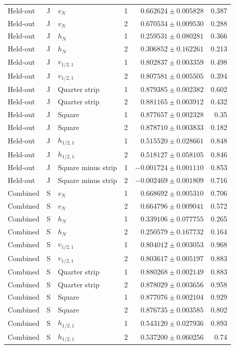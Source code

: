 {\begin{longtable}{lllrrr}
Held-out & J & $v_N$ & 1 & $0.662624\pm0.005828$ & 0.387\\
Held-out & J & $v_N$ & 2 & $0.670534\pm0.009530$ & 0.288\\
Held-out & J & $h_N$ & 1 & $0.259531\pm0.080281$ & 0.366\\
Held-out & J & $h_N$ & 2 & $0.306852\pm0.162261$ & 0.213\\
Held-out & J & $v_{1/2,1}$ & 1 & $0.802837\pm0.003359$ & 0.498\\
Held-out & J & $v_{1/2,1}$ & 2 & $0.807581\pm0.005505$ & 0.394\\
Held-out & J & Quarter strip & 1 & $0.879385\pm0.002382$ & 0.602\\
Held-out & J & Quarter strip & 2 & $0.881165\pm0.003912$ & 0.432\\
Held-out & J & Square & 1 & $0.877657\pm0.002328$ & 0.35\\
Held-out & J & Square & 2 & $0.878710\pm0.003833$ & 0.182\\
Held-out & J & $h_{1/2,1}$ & 1 & $0.515520\pm0.028661$ & 0.848\\
Held-out & J & $h_{1/2,1}$ & 2 & $0.518127\pm0.058105$ & 0.846\\
Held-out & J & Square minus strip & 1 & $-0.001724\pm0.001110$ & 0.853\\
Held-out & J & Square minus strip & 2 & $-0.002469\pm0.001809$ & 0.716\\
Combined & S & $v_N$ & 1 & $0.668692\pm0.005310$ & 0.706\\
Combined & S & $v_N$ & 2 & $0.664796\pm0.009041$ & 0.572\\
Combined & S & $h_N$ & 1 & $0.339106\pm0.077755$ & 0.265\\
Combined & S & $h_N$ & 2 & $0.250579\pm0.167732$ & 0.164\\
Combined & S & $v_{1/2,1}$ & 1 & $0.804012\pm0.003053$ & 0.968\\
Combined & S & $v_{1/2,1}$ & 2 & $0.803617\pm0.005197$ & 0.883\\
Combined & S & Quarter strip & 1 & $0.880268\pm0.002149$ & 0.883\\
Combined & S & Quarter strip & 2 & $0.878029\pm0.003656$ & 0.958\\
Combined & S & Square & 1 & $0.877076\pm0.002104$ & 0.929\\
Combined & S & Square & 2 & $0.876735\pm0.003585$ & 0.802\\
Combined & S & $h_{1/2,1}$ & 1 & $0.543120\pm0.027936$ & 0.893\\
Combined & S & $h_{1/2,1}$ & 2 & $0.537200\pm0.060256$ & 0.74\\

\end{longtable}}
